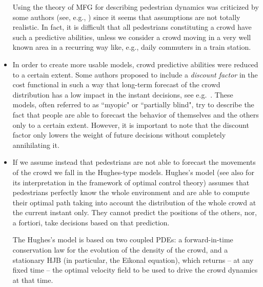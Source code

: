 \documentclass{cmslatex}
\begin{document}
\begin{itemize}[leftmargin=*]
	Using the theory of MFG for describing pedestrian dynamics was criticized by some authors (see, e.g., \cite{burger2014}) since it seems that assumptions are not totally realistic. In fact, it is difficult that all pedestrians constituting a crowd have such a predictive abilities, unless we consider a crowd moving in a very well known area in a recurring way like, e.g., daily commuters in a train station.
	\item In order to create more usable models, crowd predictive abilities were reduced to a certain extent. Some authors proposed to include a \emph{discount factor} in the cost functional in such a way that long-term forecast of the crowd distribution has a low impact in the instant decisions, see e.g.\ \cite{bardi2020, bertucci2019, degond2017}. 
	These models, often referred to as ``myopic" or ``partially blind", try to describe the fact that people are able to forecast the behavior of themselves and the others only to a certain extent. However, it is important to note that the discount factor only lowers the weight of future decisions without completely annihilating it.	
	\item If we assume instead that pedestrians are not able to forecast the movements of the crowd we fall in the Hughes-type models. 
	Hughes's model \cite{hughes2002} (see also \cite{huang2009} for its interpretation in the framework of optimal control theory) assumes that pedestrians perfectly know the whole environment and are able to compute their optimal path taking into account the distribution of the whole crowd at the current instant only. 
	They cannot predict the positions of the others, nor, a fortiori, take decisions based on that prediction.
	
	The Hughes's model is based on two coupled PDEs: a forward-in-time conservation law for the evolution of the density of the crowd, and a stationary HJB (in particular, the Eikonal equation), which returns -- at any fixed time -- the optimal velocity field to be used to drive the crowd dynamics at that time.
	

\end{itemize}
\end{document}
